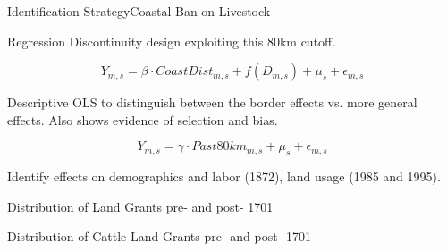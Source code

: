 \documentclass[aspectratio=1610]{beamer}
\begin{document}
\begin{frame}{Identification Strategy}{Coastal Ban on Livestock}
    \begin{outline}
        \1 Regression Discontinuity design exploiting this 80km cutoff.
    \end{outline}
    \vspace{2mm}
    \begin{equation}
        Y_{m,s} = \beta \cdot CoastDist_{m,s} + f(D_{m,s})+ \mu_s + \epsilon_{m,s}
    \end{equation}

    \begin{outline}
        \1 Descriptive OLS to distinguish between the border effects vs. more general effects.
        \vspace{2mm}
            \2 Also shows evidence of selection and bias.
    \end{outline}
    
    \begin{equation}
        Y_{m,s} = \gamma \cdot Past80km_{m,s} + \mu_s + \epsilon_{m,s}
    \end{equation}
    \vspace{-1mm}
    \begin{outline}
        \1 Identify effects on demographics and labor (1872), land usage (1985 and 1995). 
    \end{outline}
\end{frame}

\begin{frame}{Distribution of Land Grants pre- and post- 1701}
    \begin{figure}
        \begin{center}
        \end{center}
        \label{fig:SesmariasDistribution}
      \end{figure}      
\end{frame}

\begin{frame}{Distribution of Cattle Land Grants pre- and post- 1701}
    \begin{figure}
        \begin{center}
        \end{center}
      \end{figure}      
\end{frame}
\end{document}

